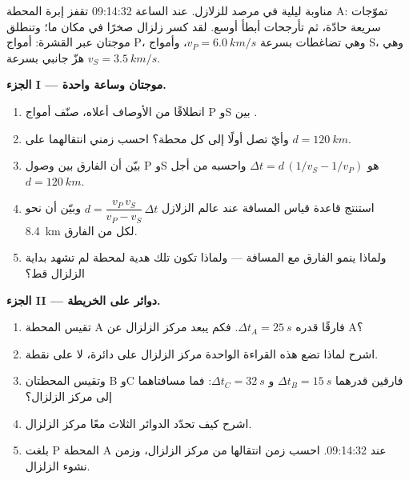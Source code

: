 \begin{problem}
\label{pb:g12:mechanical-waves:1}
مناوبة ليلية في مرصد للزلازل. عند الساعة 09:14:32 تقفز إبرة
المحطة A: تموّجات سريعة حادّة، ثم تأرجحات أبطأ أوسع. لقد
كسر زلزال صخرًا في مكان ما؛ وتنطلق موجتان عبر
القشرة: أمواج P، وهي تضاغطات بسرعة $v_P = \qty{6.0}{km/s}$، وأمواج S،
وهي هزّ جانبي بسرعة $v_S = \qty{3.5}{km/s}$.

\medskip
\noindent\textbf{الجزء I --- موجتان وساعة واحدة.}
\begin{enumerate}
  \item انطلاقًا من الأوصاف أعلاه، صنّف أمواج P وS
        بين  .
  \item وأيّ  تصل أولًا إلى كل محطة؟ احسب زمني
        انتقالهما على $d = \qty{120}{km}$.
  \item بيّن أن الفارق بين وصول P وS هو
        $\Delta t = d\,(1/v_S - 1/v_P)$ واحسبه من أجل
        $d = \qty{120}{km}$.
  \item استنتج قاعدة قياس المسافة عند عالم الزلازل
        $d = \dfrac{v_P\,v_S}{v_P - v_S}\,\Delta t$ وبيّن أن
         نحو \qty{8.4}{km} لكل  من الفارق.
  \item ولماذا ينمو الفارق مع المسافة --- ولماذا تكون تلك هدية
        لمحطة لم تشهد بداية الزلزال قط؟
\end{enumerate}

\medskip
\noindent\textbf{الجزء II --- دوائر على الخريطة.}
\begin{enumerate}[resume]
  \item تقيس المحطة A فارقًا قدره $\Delta t_A = \qty{25}{s}$. فكم يبعد
        مركز الزلزال عن A؟
  \item اشرح لماذا تضع هذه القراءة الواحدة مركز الزلزال على دائرة،
        لا على نقطة.
  \item وتقيس المحطتان B وC فارقين قدرهما $\Delta t_B = \qty{15}{s}$ و
        $\Delta t_C = \qty{32}{s}$: فما مسافتاهما إلى مركز الزلزال؟
  \item اشرح كيف تحدّد الدوائر الثلاث معًا مركز الزلزال.
  \item بلغت  P المحطة A عند 09:14:32. احسب زمن انتقالها من
        مركز الزلزال، وزمن نشوء الزلزال.
\end{enumerate}


\end{problem}
